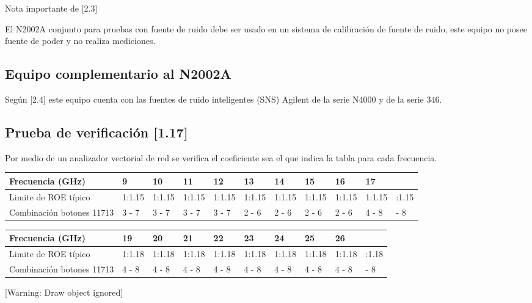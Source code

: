 Nota importante de [2.3]

El N2002A conjunto para pruebas con fuente de ruido debe ser usado en un sistema de calibración de fuente de ruido, este
equipo no posee fuente de poder y no realiza mediciones.

\subsection{Equipo complementario al N2002A}
Según [2.4] este equipo cuenta con las fuentes de ruido inteligentes (SNS) Agilent de la serie N4000 y de la serie 346.

\subsection{Prueba de verificación [1.17]}
Por medio de un analizador vectorial de red se verifica el coeficiente sea el que indica la tabla para cada frecuencia.

\begin{flushleft}
\tablefirsthead{}
\tablehead{}
\tabletail{}
\tablelasttail{}
\begin{supertabular}{|m{3.972cm}|m{1.012cm}|m{1.012cm}|m{1.012cm}|m{1.012cm}|m{1.012cm}|m{1.012cm}|m{1.012cm}|m{1.012cm}|m{1.012cm}|m{1.012cm}|}
	\hline
Frecuencia (GHz) & 9 &  10 & 11 & 12 & 13 & 14 & 15 & 16 & 17 &	\\
\hline
Limite de ROE típico & 1:1.15 & 1:1.15 & 1:1.15 & 1:1.15 & 1:1.15 & 1:1.15 & 1:1.15 &
1:1.15 & 1:1.15 & :1.15	\\
\hline
Combinación botones 11713 & 3 - 7 & 3 - 7 & 3 - 7 & 3 - 7 & 2 - 6 & 2 - 6 & 2 - 6 & 
2 - 6 & 4 - 8 &  - 8	\\
\hline
\end{supertabular}
\end{flushleft}

\begin{flushleft}
\tablefirsthead{}
\tablehead{}
\tabletail{}
\tablelasttail{}
\begin{supertabular}{|m{3.972cm}|m{1.012cm}|m{1.012cm}|m{1.012cm}|m{1.012cm}|m{1.012cm}|m{1.012cm}|m{1.012cm}|m{1.012cm}|m{1.012cm}|}
	\hline
	Frecuencia (GHz) & 19 & 20 & 21 & 22 & 23 & 24 & 25 & 26 &  \\
	\hline
	Limite de ROE típico & 1:1.18 & 1:1.18 & 1:1.18 & 1:1.18 & 1:1.18 & 1:1.18 & 1:1.18 &
	1:1.18 & :1.18\\
	\hline
	Combinación botones 11713 &	4 - 8 & 4 - 8 & 4 - 8 & 4 - 8 &	4 - 8 & 4 - 8 &
	4 - 8 & 4 - 8 &	 - 8\\
	\hline
\end{supertabular}
\end{flushleft}
[Warning: Draw object ignored]

